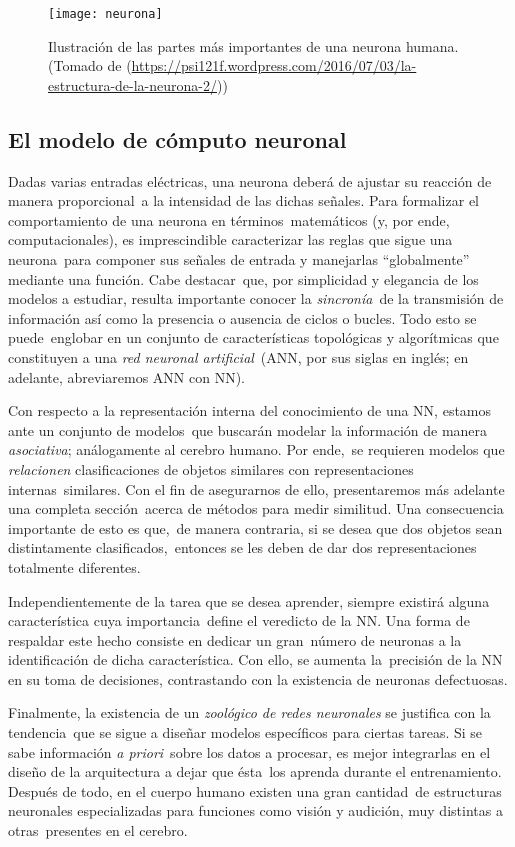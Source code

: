 \begin{figure}[h]
  \centering
  \texttt{[image: neurona]}
  \caption{Ilustración de las partes más importantes de una neurona humana.
    (Tomado de (\url{https://psi121f.wordpress.com/2016/07/03/la-estructura-de-la-neurona-2/}))}
\end{figure}


\subsection{El modelo de cómputo neuronal}

\noindent
Dadas varias entradas eléctricas, una neurona deberá de ajustar su reacción de manera proporcional\
a la intensidad de las dichas señales. Para formalizar el comportamiento de una neurona en términos\
matemáticos (y, por ende, computacionales), es imprescindible caracterizar las reglas que sigue una neurona\
para componer sus señales de entrada y manejarlas ``globalmente'' mediante una función. Cabe destacar\
que, por simplicidad y elegancia de los modelos a estudiar, resulta importante conocer la \emph{sincronía}\
de la transmisión de información así como la presencia o ausencia de ciclos o bucles. Todo esto se puede\
englobar en un conjunto de características topológicas y algorítmicas que constituyen a una \emph{red neuronal artificial}\
(ANN, por sus siglas en inglés; en adelante, abreviaremos ANN con NN).\par
Con respecto a la representación interna del conocimiento de una NN, estamos ante un conjunto de modelos\
que buscarán modelar la información de manera \emph{asociativa}; análogamente al cerebro humano. Por ende,\
se requieren modelos que \emph{relacionen} clasificaciones de objetos similares con representaciones internas\
similares. Con el fin de asegurarnos de ello, presentaremos más adelante una completa sección\
acerca de métodos para medir similitud. Una consecuencia importante de esto es que,\
de manera contraria, si se desea que dos objetos sean distintamente clasificados,\
entonces se les deben de dar dos representaciones totalmente diferentes.\par
Independientemente de la tarea que se desea aprender, siempre existirá alguna característica cuya importancia\
define el veredicto de la NN. Una forma de respaldar este hecho consiste en dedicar un gran\
número de neuronas a la identificación de dicha característica. Con ello, se aumenta la\
precisión de la NN en su toma de decisiones, contrastando con la existencia de neuronas defectuosas.\par
Finalmente, la existencia de un \emph{zoológico de redes neuronales} se justifica con la tendencia\
que se sigue a diseñar modelos específicos para ciertas tareas. Si se sabe información \textit{a priori}\
sobre los datos a procesar, es mejor integrarlas en el diseño de la arquitectura a dejar que ésta\
los aprenda durante el entrenamiento. Después de todo, en el cuerpo humano existen una gran cantidad\
de estructuras neuronales especializadas para funciones como visión y audición, muy distintas a otras\
presentes en el cerebro.

